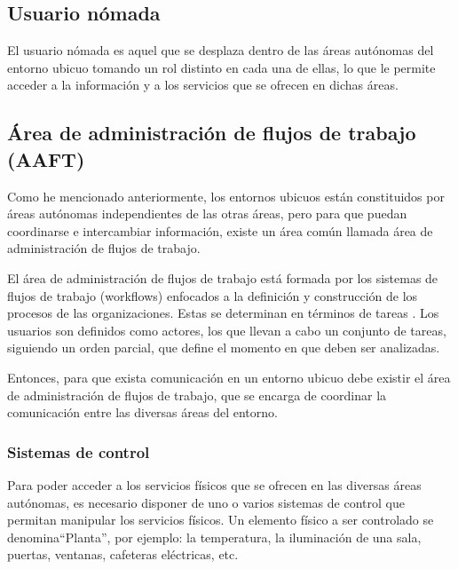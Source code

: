 \subsection{Usuario nómada}

El usuario nómada es aquel que se desplaza dentro de las áreas
autónomas del entorno ubicuo tomando un rol distinto en cada una
de ellas, lo que le permite acceder a la información y a los
servicios que se ofrecen en dichas áreas.\\

\vspace{0.2cm}

\subsection{Área de administración de flujos de trabajo (AAFT)}

Como he mencionado anteriormente, los entornos ubicuos están
constituidos por áreas autónomas independientes de las otras
áreas, pero para que puedan coordinarse e intercambiar
información, existe un área común llamada área de administración
de flujos de trabajo.\\

\vspace{0.2cm}

El área de administración de flujos de trabajo está formada por
los sistemas de flujos de trabajo (workflows) enfocados a la
definición y construcción de los procesos de las organizaciones.
Estas se determinan en términos de tareas\cite{articulodeZur} .
Los usuarios son definidos como actores, los que llevan a cabo un
conjunto de tareas, siguiendo un orden parcial, que define el
momento en que
deben ser analizadas.\\

\vspace{0.2cm}

Entonces, para que exista comunicación en un entorno ubicuo debe
existir el área de administración de flujos de trabajo, que se
encarga de coordinar la comunicación entre las diversas áreas del
entorno.\\

\vspace{0.2cm}

\subsubsection{Sistemas de control}

Para poder acceder a los servicios físicos que se ofrecen en las
diversas áreas autónomas, es necesario disponer de uno o varios
sistemas de control que permitan manipular los servicios físicos.
Un elemento físico a ser controlado se denomina``Planta'', por
ejemplo: la temperatura, la iluminación de una sala, puertas,
ventanas, cafeteras eléctricas, etc.\\

